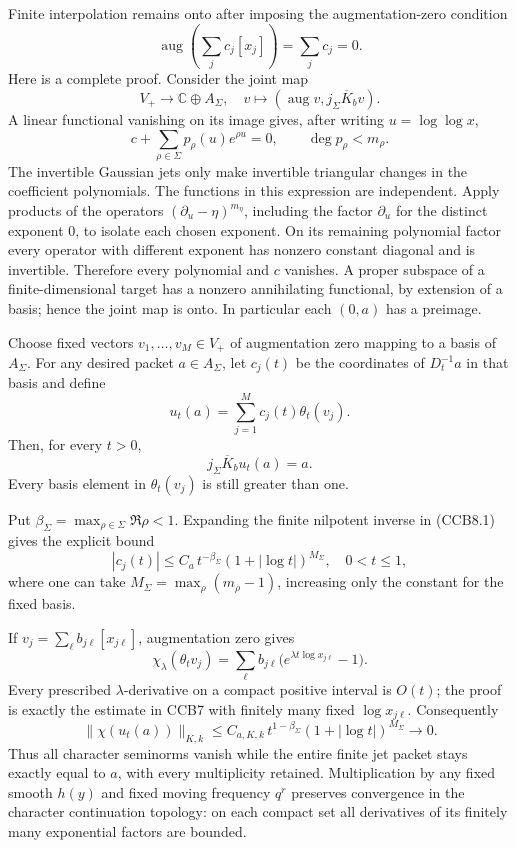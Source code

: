 Finite interpolation remains onto after imposing the augmentation-zero
condition \[
\operatorname{aug}\left(\sum_jc_j[x_j]\right)=\sum_jc_j=0.
\tag{CCB8.2}
\] Here is a complete proof. Consider the joint map \[
V_+\longrightarrow\mathbb C\oplus A_\Sigma,\quad
v\longmapsto(\operatorname{aug}v,j_\Sigma\overline K_bv).
\] A linear functional vanishing on its image gives, after writing
\(u=\log\log x\), \[
c+\sum_{\rho\in\Sigma}p_\rho(u)e^{\rho u}=0,\qquad
\deg p_\rho<m_\rho.
\] The invertible Gaussian jets only make invertible triangular changes
in the coefficient polynomials. The functions in this expression are
independent. Apply products of the operators
\((\partial_u-\eta)^{m_\eta}\), including the factor \(\partial_u\) for
the distinct exponent \(0\), to isolate each chosen exponent. On its
remaining polynomial factor every operator with different exponent has
nonzero constant diagonal and is invertible. Therefore every polynomial
and \(c\) vanishes. A proper subspace of a finite-dimensional target has
a nonzero annihilating functional, by extension of a basis; hence the
joint map is onto. In particular each \((0,a)\) has a preimage.

Choose fixed vectors \(v_1,\ldots,v_M\in V_+\) of augmentation zero
mapping to a basis of \(A_\Sigma\). For any desired packet
\(a\in A_\Sigma\), let \(c_j(t)\) be the coordinates of \(D_t^{-1}a\) in
that basis and define \[
u_t(a)=\sum_{j=1}^M c_j(t)\theta_t(v_j).
\tag{CCB8.3}
\] Then, for every \(t>0\), \[
\boxed{j_\Sigma\overline K_bu_t(a)=a.}
\tag{CCB8.4}
\] Every basis element in \(\theta_t(v_j)\) is still greater than one.

Put \(\beta_\Sigma=\max_{\rho\in\Sigma}\Re\rho<1\). Expanding the finite
nilpotent inverse in (CCB8.1) gives the explicit bound \[
|c_j(t)|\le C_a\,t^{-\beta_\Sigma}
(1+|\log t|)^{M_\Sigma},\quad0<t\le1,
\tag{CCB8.5}
\] where one can take \(M_\Sigma=\max_\rho(m_\rho-1)\), increasing only
the constant for the fixed basis.

If \(v_j=\sum_\ell b_{j\ell}[x_{j\ell}]\), augmentation zero gives \[
\chi_\lambda(\theta_tv_j)
=\sum_\ell b_{j\ell}
\bigl(e^{\lambda t\log x_{j\ell}}-1\bigr).
\] Every prescribed \(\lambda\)-derivative on a compact positive
interval is \(O(t)\); the proof is exactly the estimate in CCB7 with
finitely many fixed \(\log x_{j\ell}\). Consequently \[
\|\chi(u_t(a))\|_{K,k}
\le C_{a,K,k}\,
t^{1-\beta_\Sigma}(1+|\log t|)^{M_\Sigma}
\longrightarrow0.
\tag{CCB8.6}
\] Thus all character seminorms vanish while the entire finite jet
packet stays exactly equal to \(a\), with every multiplicity retained.
Multiplication by any fixed smooth \(h(y)\) and fixed moving frequency
\(q^r\) preserves convergence in the character continuation topology: on
each compact set all derivatives of its finitely many exponential
factors are bounded.

